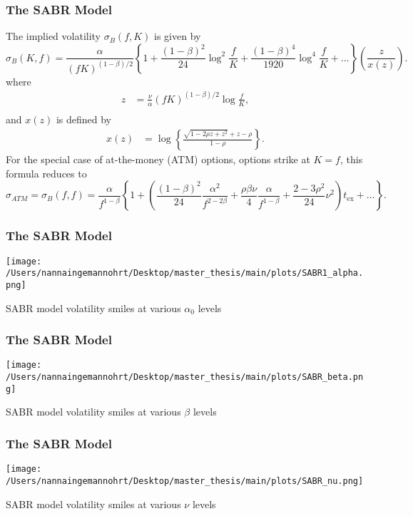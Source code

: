 \documentclass{beamer}
\begin{document}
\begin{frame}
    \frametitle{\textcolor{KUrod}{The SABR Model}}
    \scriptsize
    The implied volatility $\sigma_B(f, K)$ is given by
    \begin{equation}
        \sigma_B(K, f) = \frac{\alpha}{(fK)^{(1-\beta)/2}} \left\{ 1 + \frac{(1-\beta)^2}{24} \log^2 \frac{f}{K} + \frac{(1-\beta)^4}{1920} \log^4 \frac{f}{K} + \ldots \right\} \left( \frac{z}{x(z)} \right).
    \end{equation}
    where
    \begin{align}
        z &= \frac{\nu}{\alpha}(fK)^{(1-\beta)/2} \log \frac{f}{K}, \\
    \end{align}
    and \(x(z)\) is defined by
    \begin{align}
        x(z) &= \log \left\{ \frac{\sqrt{1-2\rho z + z^2} + z - \rho}{1 - \rho} \right\}.
    \end{align}
    For the special case of at-the-money (ATM) options, options strike at $K = f$, this formula reduces to
    \begin{equation}
        \sigma_{ATM} = \sigma_B(f, f) = \frac{\alpha}{f^{1-\beta}} \left\{ 1 + \left( \frac{(1-\beta)^2}{24} \frac{\alpha^2}{f^{2-2\beta}} + \frac{\rho \beta \nu}{4} \frac{\alpha}{f^{1-\beta}} + \frac{2-3\rho^2}{24} \nu^2 \right) t_{\text{ex}} + \ldots \right\}.
    \end{equation}
\end{frame}

\begin{frame}
    \frametitle{\textcolor{KUrod}{The SABR Model}}
    \centering
    \texttt{[image: /Users/nannaingemannohrt/Desktop/master\_thesis/main/plots/SABR1\_alpha.png]}
    \caption{SABR model volatility smiles at various $\alpha_0$ levels}
\end{frame}

\begin{frame}
    \frametitle{\textcolor{KUrod}{The SABR Model}}
    \centering
    \texttt{[image: /Users/nannaingemannohrt/Desktop/master\_thesis/main/plots/SABR\_beta.png]}
    \caption{SABR model volatility smiles at various $\beta$ levels}
\end{frame}

\begin{frame}
    \frametitle{\textcolor{KUrod}{The SABR Model}}
    \centering
    \texttt{[image: /Users/nannaingemannohrt/Desktop/master\_thesis/main/plots/SABR\_nu.png]}
    \caption{SABR model volatility smiles at various $\nu$ levels}
\end{frame}
\end{document}
